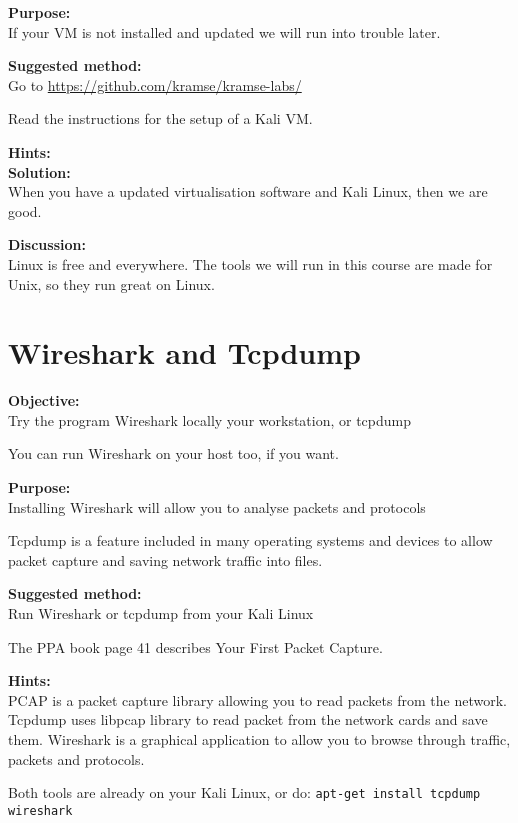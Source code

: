 \documentclass[a4paper,11pt,notitlepage]{report}
\begin{document}
{\bf Purpose:}\\
If your VM is not installed and updated we will run into trouble later.

{\bf Suggested method:}\\
Go to \url{https://github.com/kramse/kramse-labs/}

Read the instructions for the setup of a Kali VM.

{\bf Hints:}\\

{\bf Solution:}\\
When you have a updated virtualisation software and Kali Linux, then we are good.

{\bf Discussion:}\\
Linux is free and everywhere. The tools we will run in this course are made for Unix, so they run great on Linux.



\chapter{Wireshark and Tcpdump}
\label{ex:wireshark-install}



{\bf Objective:}\\
Try the program Wireshark locally your workstation, or tcpdump

You can run Wireshark on your host too, if you want.

{\bf Purpose:}\\
Installing Wireshark will allow you to analyse packets and protocols

Tcpdump is a feature included in many operating systems and devices to allow packet capture and saving network traffic into files.

{\bf Suggested method:}\\
Run Wireshark or tcpdump from your Kali Linux

The PPA book page 41 describes Your First Packet Capture.

{\bf Hints:}\\
PCAP is a packet capture library allowing you to read packets from the network.
Tcpdump uses libpcap library to read packet from the network cards and save them.
Wireshark is a graphical application to allow you to browse through traffic, packets and protocols.

Both tools are already on your Kali Linux, or do: \verb+apt-get install tcpdump wireshark+
\end{document}
